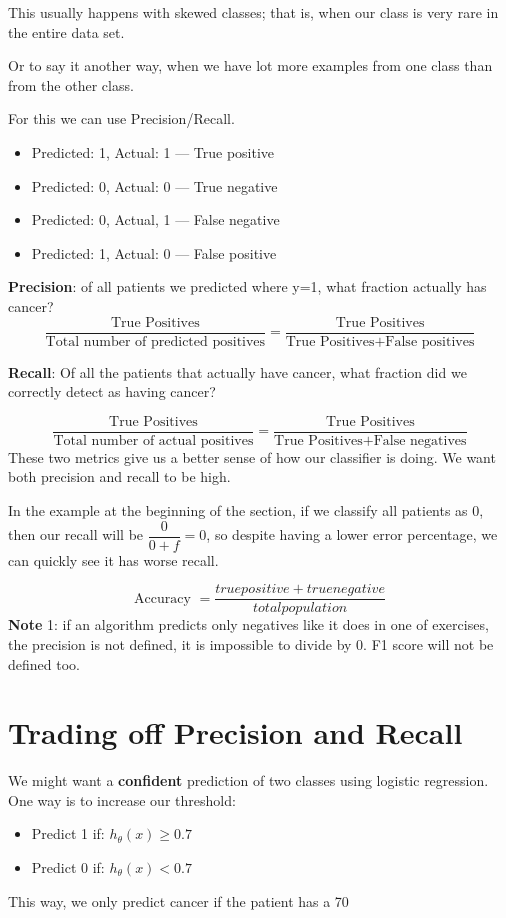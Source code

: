 This usually happens with skewed classes; that is, when our class is very rare in the entire data set.

Or to say it another way, when we have lot more examples from one class than from the other class.

For this we can use Precision/Recall.
\begin{itemize}
\item Predicted: 1, Actual: 1 --- True positive
\item Predicted: 0, Actual: 0 --- True negative
\item Predicted: 0, Actual, 1 --- False negative
\item Predicted: 1, Actual: 0 --- False positive
\end{itemize}

\textbf{Precision}: of all patients we predicted where y=1, what fraction actually has cancer?
\begin{equation}
\dfrac{\text{True Positives}}{\text{Total number of predicted positives}}
= \dfrac{\text{True Positives}}{\text{True Positives}+\text{False positives}}
\end{equation}

\textbf{Recall}: Of all the patients that actually have cancer, what fraction did we correctly detect as having cancer?

\begin{equation}
\dfrac{\text{True Positives}}{\text{Total number of actual positives}}= \dfrac{\text{True Positives}}{\text{True Positives}+\text{False negatives}} 
\end{equation}
These two metrics give us a better sense of how our classifier is doing. We want both precision and recall to be high.

In the example at the beginning of the section, if we classify all patients as 0, then our recall will be $\dfrac{0}{0 + f} = 0 $, so despite having a lower error percentage, we can quickly see it has worse recall.

\[
 \text{Accuracy } = \frac {true positive + true negative} {total population} 
\]
\textbf{Note} 1: if an algorithm predicts only negatives like it does in one of exercises, the precision is not defined, it is impossible to divide by 0. F1 score will not be defined too.

\section{Trading off Precision and Recall}
We might want a \textbf{confident} prediction of two classes using logistic regression. One way is to increase our threshold:
\begin{itemize}
\item Predict 1 if: $h_\theta(x) \geq 0.7$
\item Predict 0 if: $h_\theta(x) < 0.7$
\end{itemize}
This way, we only predict cancer if the patient has a 70%

